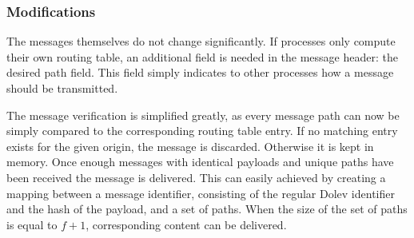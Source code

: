 



\subsubsection{Modifications}

The messages themselves do not change significantly. If processes only compute their own routing table, an additional field is needed in the message header: the desired path field. This field simply indicates to other processes how a message should be transmitted.

The message verification is simplified greatly, as every message path can now be simply compared to the corresponding routing table entry. If no matching entry exists for the given origin, the message is discarded. Otherwise it is kept in memory. Once enough messages with identical payloads and unique paths have been received the message is delivered. This can easily achieved by creating a mapping between a message identifier, consisting of the regular Dolev identifier and the hash of the payload, and a set of paths. When the size of the set of paths is equal to $f+1$, corresponding content can be delivered.


